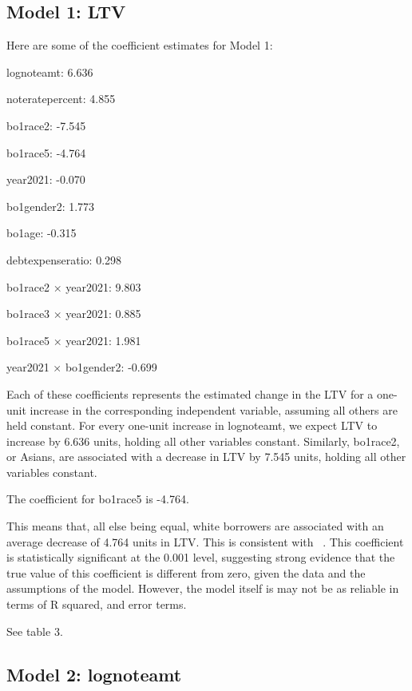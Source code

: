 \documentclass[12pt,english]{article}
\begin{document}
\subsection{Model 1: LTV}

Here are some of the coefficient estimates for Model 1:
\begin{itemize}
\begin{singlespace}
    \item lognoteamt: 6.636
    \item noteratepercent: 4.855
    \item bo1race2: -7.545
    \item bo1race5: -4.764
    \item year2021: -0.070
    \item bo1gender2: 1.773
    \item bo1age: -0.315
    \item debtexpenseratio: 0.298
    \item bo1race2 × year2021: 9.803
    \item bo1race3 × year2021: 0.885
    \item bo1race5 × year2021: 1.981
    \item year2021 × bo1gender2: -0.699
    \end{singlespace}
\end{itemize}

Each of these coefficients represents the estimated change in the LTV for a one-unit increase in the corresponding independent variable, assuming all others are held constant. For every one-unit increase in lognoteamt, we expect LTV to increase by 6.636 units, holding all other variables constant. Similarly, bo1race2, or Asians, are associated with a decrease in LTV by 7.545 units, holding all other variables constant.

The coefficient for bo1race5 is -4.764.

This means that, all else being equal, white borrowers are associated with an average decrease of 4.764 units in LTV. This is consistent with ~\cite{gupta2022financial}. This coefficient is statistically significant at the 0.001 level, suggesting strong evidence that the true value of this coefficient is different from zero, given the data and the assumptions of the model. However, the model itself is may not be as reliable in terms of R squared, and error terms. 

See table 3.

 \subsection{Model 2: lognoteamt}
 
\end{document}
